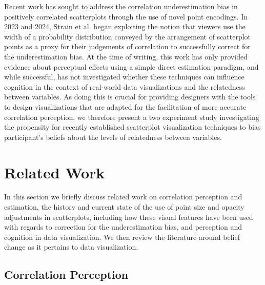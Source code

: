 \documentclass[manuscript,screen,review]{acmart}
\begin{document}
Recent work has sought to address the correlation underestimation bias
in positively correlated scatterplots through the use of novel point
encodings. In 2023 and 2024, Strain et al.
\citep{strain_2023, strain_2023b, strain_2024} began exploiting the
notion that viewers use the width of a probability distribution conveyed
by the arrangement of scatterplot points as a proxy for their judgements
of correlation to successfully correct for the underestimation bias. At
the time of writing, this work has only provided evidence about
perceptual effects using a simple direct estimation paradigm, and while
successful, has not investigated whether these techniques can influence
cognition in the context of real-world data visualizations and the
relatedness between variables. As doing this is crucial for providing
designers with the tools to design visualizations that are adapted for
the facilitation of more accurate correlation perception, we therefore
present a two experiment study investigating the propensity for recently
established scatterplot visualization techniques to bias participant's
beliefs about the levels of relatedness between variables.

\section{Related Work}\label{sec-rel-work-main}

In this section we briefly discuss related work on correlation
perception and estimation, the history and current state of the use of
point size and opacity adjustments in scatterplots, including how these
visual features have been used with regards to correction for the
underestimation bias, and perception and cognition in data
visualization. We then review the literature around belief change as it
pertains to data visualization.

\subsection{Correlation Perception}\label{sec-corr-percept}
\end{document}
